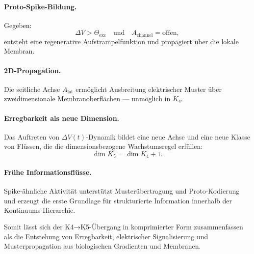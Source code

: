\paragraph{Proto-Spike-Bildung.}
Gegeben:
\[
\Delta V > \Theta_{\mathrm{exc}}
\quad\text{und}\quad
A_{\mathrm{channel}} = \text{offen},
\]
entsteht eine regenerative Aufstrampelfunktion und propagiert über die lokale
Membran.

\paragraph{2D-Propagation.}
Die seitliche Achse $A_{\mathrm{lat}}$ ermöglicht Ausbreitung elektrischer Muster
über zweidimensionale Membranoberflächen — unmöglich in $K₄$.

\paragraph{Erregbarkeit als neue Dimension.}
Das Auftreten von $\Delta V(t)$-Dynamik bildet eine neue Achse und eine neue
Klasse von Flüssen, die die dimensionsbezogene Wachstumsregel erfüllen:
\[
\dim K_5 = \dim K_4 + 1.
\]

\paragraph{Frühe Informationsflüsse.}
Spike-ähnliche Aktivität unterstützt Musterübertragung und Proto-Kodierung und
erzeugt die erste Grundlage für strukturierte Information innerhalb der
Kontinuums-Hierarchie.

Somit lässt sich der K4→K5-Übergang in komprimierter Form zusammenfassen als die
Entstehung von Erregbarkeit, elektrischer Signalisierung und Musterpropagation aus
biologischen Gradienten und Membranen.
